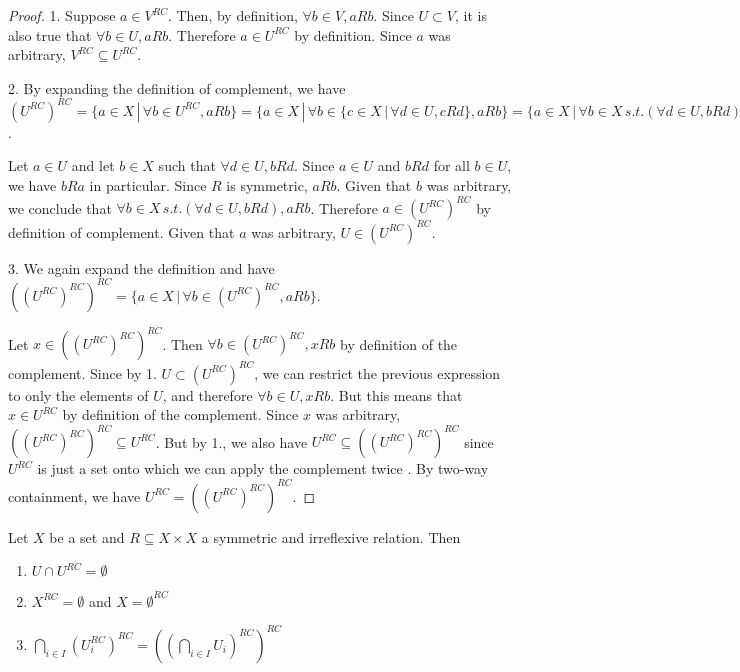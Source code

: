 \begin{proof}
	1. Suppose $a \in V^{RC}$. Then, by definition, $\forall b \in V, aRb$. Since $U \subset V$, it is also true that $\forall b \in U, aRb$. Therefore $a \in U^{RC}$ by definition. Since $a$ was arbitrary, $V^{RC} \subseteq U^{RC}$.
	
	2. By expanding the definition of complement, we have $(U^{RC})^{RC}=\{ a \in X \, | \, \forall b \in U^{RC}, aRb \} = \{ a \in X \, | \, \forall b \in \{ c \in X \, | \, \forall d \in U, cRd  \}, aRb \} = \{ a \in X \, | \, \forall b \in X \, s.t. (\forall d \in U, bRd), aRb \}$.
	
	Let $a \in U$ and let $b \in X$ such that $\forall d \in U, bRd$. Since $a \in U$ and $bRd$ for all $b \in U$, we have $bRa$ in particular. Since $R$ is symmetric, $aRb$. Given that $b$ was arbitrary, we conclude that $\forall b \in X \, s.t. (\forall d \in U, bRd), aRb$. Therefore $a \in (U^{RC})^{RC}$ by definition of complement. Given that $a$ was arbitrary, $U \in (U^{RC})^{RC}$.
	
	3. We again expand the definition and have $((U^{RC})^{RC})^{RC} = \{ a \in X \, | \, \forall b \in (U^{RC})^{RC}, aRb \}$.
	
	Let $x \in ((U^{RC})^{RC})^{RC}$. Then $\forall b \in (U^{RC})^{RC}, xRb$ by definition of the complement. Since by 1. $U \subset (U^{RC})^{RC}$, we can restrict the previous expression to only the elements of $U$, and therefore $\forall b \in U, xRb$. But this means that $x \in U^{RC}$ by definition of the complement. Since $x$ was arbitrary, $((U^{RC})^{RC})^{RC} \subseteq U^{RC}$. But by 1., we also have $U^{RC} \subseteq ((U^{RC})^{RC})^{RC}$ since $U^{RC}$ is just a set onto which we can apply the complement twice . By two-way containment, we have $U^{RC} = ((U^{RC})^{RC})^{RC}$.
\end{proof}

\begin{conj}\label{pm_ensmblespaces_symirreflproperties}
	Let $X$ be a set and $R \subseteq X \times X$ a symmetric and irreflexive relation. Then
	\begin{enumerate}
		\item $U \cap U^{RC} = \emptyset$
		\item $X^{RC} = \emptyset$ and $X = \emptyset^{RC}$
		\item $\bigcap_{i \in I} (U_i^{RC})^{RC} = ((\bigcap_{i \in I} U_i)^{RC})^{RC}$
	\end{enumerate}
\end{conj}

